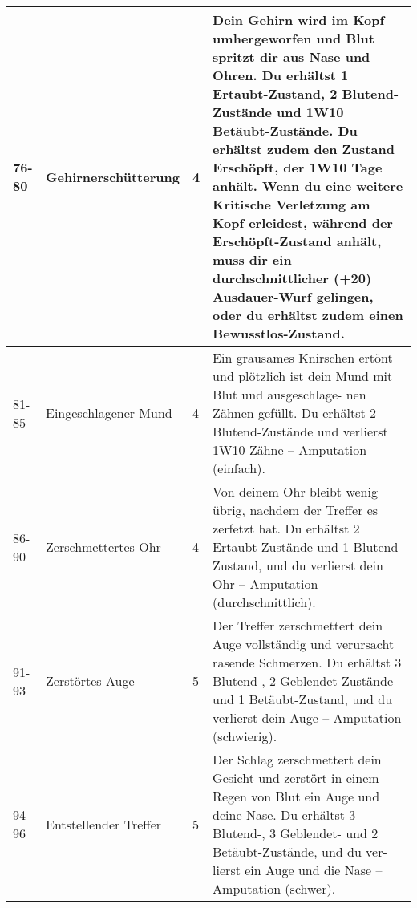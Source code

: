 \documentclass[a4paper, fontsize=8.5pt]{scrartcl}
\begin{document}
\begin{table}[!ht]
\begin{tabularx}{\textwidth}{lp{2.5cm}lX}
        76-80         & Gehirnerschütterung     & 4           & Dein Gehirn wird im Kopf umhergeworfen und Blut spritzt dir aus Nase und Ohren. Du erhältst 1 Ertaubt-Zustand, 2 Blutend-Zustände und 1W10 Betäubt-Zustände. Du erhältst zudem den Zustand Erschöpft, der 1W10 Tage anhält. Wenn du eine weitere Kritische Verletzung am Kopf erleidest, während der Erschöpft-Zustand anhält, muss dir ein durchschnittlicher (+20) Ausdauer-Wurf gelingen, oder du erhältst zudem einen Bewusstlos-Zustand. \\ \hline
        81-85         & Eingeschlagener Mund    & 4           & Ein grausames Knirschen ertönt und plötzlich ist dein Mund mit Blut und ausgeschlage- nen Zähnen gefüllt. Du erhältst 2 Blutend-Zustände und verlierst 1W10 Zähne – Amputation (einfach).                                                                                                                                                                                                                                                     \\ \hline
        86-90         & Zerschmettertes Ohr     & 4           & Von deinem Ohr bleibt wenig übrig, nachdem der Treffer es zerfetzt hat. Du erhältst 2 Ertaubt-Zustände und 1 Blutend-Zustand, und du verlierst dein Ohr – Amputation (durchschnittlich).                                                                                                                                                                                                                                                      \\ \hline
        91-93         & Zerstörtes Auge         & 5           & Der Treffer zerschmettert dein Auge vollständig und verursacht rasende Schmerzen. Du erhältst 3 Blutend-, 2 Geblendet-Zustände und 1 Betäubt-Zustand, und du verlierst dein Auge – Amputation (schwierig).                                                                                                                                                                                                                                    \\ \hline
        94-96         & Entstellender Treffer   & 5           & Der Schlag zerschmettert dein Gesicht und zerstört in einem Regen von Blut ein Auge und deine Nase. Du erhältst 3 Blutend-, 3 Geblendet- und 2 Betäubt-Zustände, und du ver- lierst ein Auge und die Nase – Amputation (schwer).                                                                                                                                                                                                              \\ \hline

\end{tabularx}
\end{table}
\end{document}
